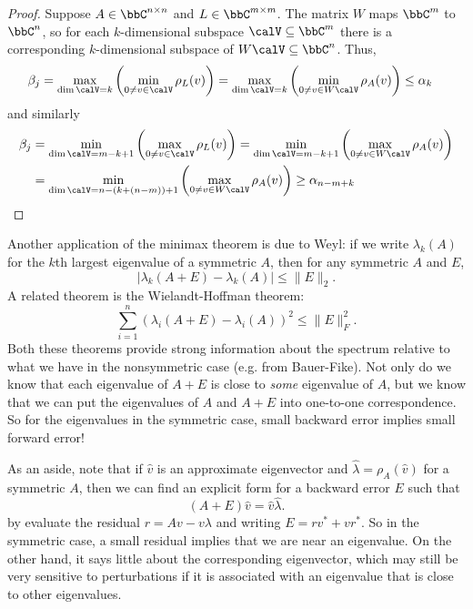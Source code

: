 \begin{proof}
  Suppose $A \in \bbC^{n \times n}$ and $L \in \bbC^{m \times m}$.  The matrix
  $W$ maps $\bbC^{m}$ to $\bbC^{n}$, so for each $k$-dimensional subspace
  $\calV \subseteq \bbC^{m}$ there is a corresponding
  $k$-dimensional subspace of $W\calV \subseteq \bbC^{n}$.  Thus,
  \begin{align*}
  \beta_j &=
    \max_{\dim \calV = k} \left( \min_{0 \neq v \in \calV} \rho_L(v) \right)
  = \max_{\dim \calV = k} \left( \min_{0 \neq v \in W\calV} \rho_A(v) \right)
  \leq \alpha_k
  \end{align*}
  and similarly
  \begin{align*}
  \beta_j &=
    \min_{\dim \calV = m-k+1} \left( \max_{0 \neq v \in \calV} \rho_L(v) \right)
  =
    \min_{\dim \calV = m-k+1} \left( \max_{0 \neq v \in W\calV} \rho_A(v) \right) \\
  &=
    \min_{\dim \calV = n-(k+(n-m))+1} \left( \max_{0 \neq v \in W\calV} \rho_A(v) \right)
   \geq \alpha_{n-m+k}
  \end{align*}
\end{proof}

Another application of the minimax theorem is due to Weyl:
if we write $\lambda_k(A)$ for the $k$th largest eigenvalue of
a symmetric $A$, then for any symmetric $A$ and $E$,
\[
  |\lambda_k(A+E)-\lambda_k(A)| \leq \|E\|_2.
\]
A related theorem is the Wielandt-Hoffman theorem:
\[
  \sum_{i=1}^n (\lambda_i(A+E)-\lambda_i(A))^2 \leq \|E\|_F^2.
\]
Both these theorems provide strong information about the spectrum
relative to what we have in the nonsymmetric case (e.g. from
Bauer-Fike).  Not only do we know that each eigenvalue of $A+E$ is
close to {\em some} eigenvalue of $A$, but we know that we can put the
eigenvalues of $A$ and $A+E$ into one-to-one correspondence.  So for
the eigenvalues in the symmetric case, small backward error implies
small forward error!

As an aside, note that if $\hat{v}$ is an approximate eigenvector and
$\hat{\lambda} = \rho_A(\hat{v})$ for a symmetric $A$, then we can
find an explicit form for a backward error $E$ such that
\[
  (A+E)\hat{v} = \hat{v}\hat{\lambda}.
\]
by evaluate the residual $r = Av-v\lambda$ and writing $E = rv^* + vr^*$.
So in the symmetric case, a small residual implies that we are near an
eigenvalue.  On the other hand, it says little about the corresponding
eigenvector, which may still be very sensitive to perturbations if
it is associated with an eigenvalue that is close to other eigenvalues.

